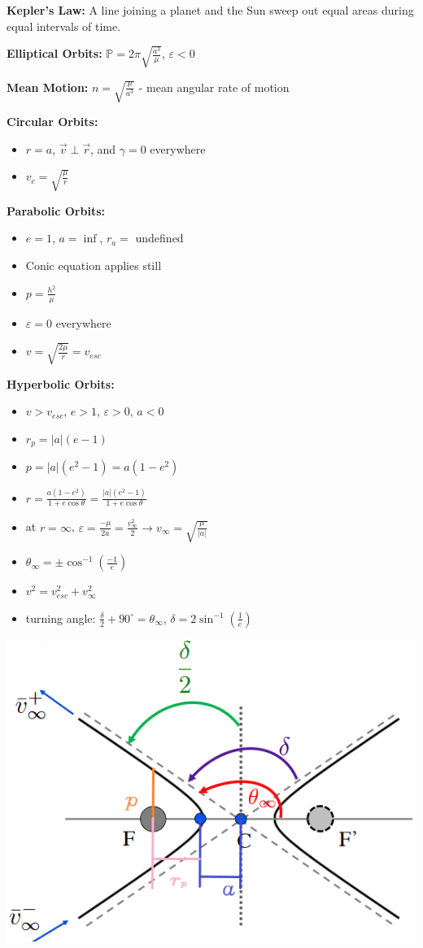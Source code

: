 \documentclass{article}
\begin{document}
\begin{multicols*}{3}
    \textbf{Kepler's Law:} A line joining a planet and the Sun sweep out equal areas during equal intervals of time.\par 
    \textbf{Elliptical Orbits:} $\mathbb{P}=2\pi\sqrt{\frac{a^3}{\mu}}$, $\varepsilon<0$\par
    \textbf{Mean Motion:} $n=\sqrt{\frac{\mu}{a^3}}$ - mean angular rate of motion\par 
    \textbf{Circular Orbits:}
    \begin{itemize}
        \itemsep0em
        \item $r = a$, $\vec{v} \perp \vec{r}$, and $\gamma = 0$ everywhere
        \item $v_c=\sqrt{\frac{\mu}{r}}$
    \end{itemize}
    \textbf{Parabolic Orbits:}
    \begin{itemize}
        \itemsep0em
        \item $e=1$, $a=\inf$, $r_a=$ undefined
        \item Conic equation applies still
        \item $p = \frac{h^2}{\mu}$
        \item $\varepsilon=0$ everywhere
        \item $v = \sqrt{\frac{2\mu}{r}}=v_{esc}$
    \end{itemize}
    \textbf{Hyperbolic Orbits:}
    \begin{itemize}
        \itemsep0em
        \item $v>v_{esc}$, $e>1$, $\varepsilon>0$, $a<0$
        \item $r_p=|a|(e-1)$
        \item $p=|a|(e^2-1)=a(1-e^2)$
        \item $r=\frac{a(1-e^2)}{1+e\cos{\theta}}=\frac{|a|(e^2-1)}{1+e\cos{\theta}}$
        \item at $r = \infty$, $\varepsilon = \frac{-\mu}{2a}=\frac{v^2_{\infty}}{2}\rightarrow v_{\infty}=\sqrt{\frac{\mu}{|a|}}$
        \item $\theta_{\infty} = \pm\cos^{-1}\left({\frac{-1}{e}}\right)$
        \item $v^2=v^2_{esc}+v^2_{\infty}$
        \item turning angle: $\frac{\delta}{2}+90^\circ=\theta_\infty$, $\delta = 2\sin^{-1}({\frac{1}{e}})$
    \end{itemize}
    \includegraphics[width=0.5\linewidth]{Figures/hyperbolic_orbit.png}


\end{multicols*}
\end{document}
